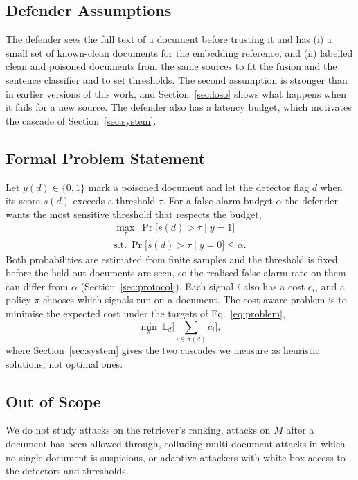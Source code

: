 \subsection{Defender Assumptions}
The defender sees the full text of a document before trusting it and has
(i) a small set of known-clean documents for the embedding reference, and
(ii) labelled clean and poisoned documents from the same sources to fit the
fusion and the sentence classifier and to set thresholds. The second assumption
is stronger than in earlier versions of this work, and Section~\ref{sec:loso}
shows what happens when it fails for a new source. The defender also has a latency
budget, which motivates the cascade of Section~\ref{sec:system}.

\subsection{Formal Problem Statement}
Let $y(d)\in\{0,1\}$ mark a poisoned document and let the detector flag $d$ when
its score $s(d)$ exceeds a threshold $\tau$. For a false-alarm budget $\alpha$ the
defender wants the most sensitive threshold that respects the budget,
\begin{equation}
    \begin{gathered}
    \max_{\tau}\ \Pr\big[s(d)>\tau\mid y=1\big]\\
    \text{s.t.}\ \Pr\big[s(d)>\tau\mid y=0\big]\le\alpha .
    \end{gathered}
    \label{eq:problem}
\end{equation}
Both probabilities are estimated from finite samples and the threshold is fixed
before the held-out documents are seen, so the realised false-alarm rate on them can differ
from $\alpha$ (Section~\ref{sec:protocol}). Each signal $i$ also has a cost $c_i$,
and a policy $\pi$ chooses which signals run on a document. The cost-aware problem
is to minimise the expected cost under the targets of Eq.~\eqref{eq:problem},
\begin{equation}
    \min_{\pi}\ \mathbb{E}_{d}\Big[\sum_{i\in\pi(d)}c_i\Big],
    \label{eq:costproblem}
\end{equation}
where Section~\ref{sec:system} gives the two cascades we measure as heuristic
solutions, not optimal ones.

\subsection{Out of Scope}
We do not study attacks on the retriever's ranking, attacks on $M$ after a
document has been allowed through, colluding multi-document attacks in which no
single document is suspicious, or adaptive attackers with white-box access to the
detectors and thresholds.